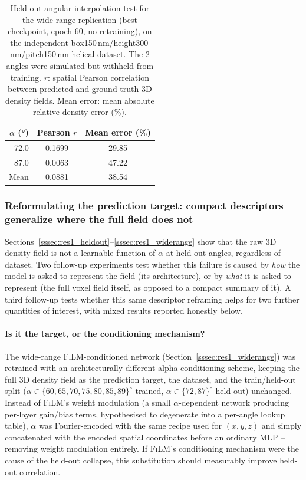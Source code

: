 \documentclass[aip,amsmath,amssymb,reprint]{revtex4-1}
\renewcommand{\ang}{\ensuremath{\alpha}} %
\newcommand{\film}{\textsc{FiLM}}
\begin{document}
\begin{table}[htbp]
  \centering
  \caption{%
    Held-out angular-interpolation test for the wide-range replication
    (best checkpoint, epoch 60, no retraining), on the independent
    box150\,nm/height300\,nm/pitch150\,nm helical dataset. The 2 angles
    were simulated but withheld from training. $r$: spatial Pearson
    correlation between predicted and ground-truth 3D density fields.
    Mean error: mean absolute relative density error (\%).
  }
  \label{tab:widerange_heldout}
  \begin{tabular}{rcc}
    \toprule
    $\ang$ (°) & Pearson $r$ & Mean error (\%) \\
    \midrule
    72.0 & 0.1699 & 29.85 \\
    87.0 & 0.0063 & 47.22 \\
    \midrule
    Mean & 0.0881 & 38.54 \\
    \bottomrule
  \end{tabular}
\end{table}

\subsubsection{Reformulating the prediction target: compact descriptors generalize where the full field does not}
\label{sssec:res1_descriptors}

Sections~\ref{sssec:res1_heldout}--\ref{sssec:res1_widerange} show that
the raw 3D density field is not a learnable function of $\ang$ at
held-out angles, regardless of dataset. Two follow-up experiments test
whether this failure is caused by \emph{how} the model is asked to
represent the field (its architecture), or by \emph{what} it is asked
to represent (the full voxel field itself, as opposed to a compact
summary of it). A third follow-up tests whether this same descriptor
reframing helps for two further quantities of interest, with mixed
results reported honestly below.

\paragraph{Is it the target, or the conditioning mechanism?}
The wide-range \film{}-conditioned network (Section~\ref{sssec:res1_widerange})
was retrained with an architecturally different alpha-conditioning
scheme, keeping the full 3D density field as the prediction target,
the dataset, and the train/held-out split ($\ang\in\{60,65,70,75,80,85,89\}^{\circ}$
trained, $\ang\in\{72,87\}^{\circ}$ held out) unchanged. Instead of
\film{}'s weight modulation (a small $\alpha$-dependent network
producing per-layer gain/bias terms, hypothesised to degenerate into a
per-angle lookup table), $\alpha$ was Fourier-encoded with the same
recipe used for $(x,y,z)$ and simply concatenated with the encoded
spatial coordinates before an ordinary MLP -- removing weight
modulation entirely. If \film{}'s conditioning mechanism were the
cause of the held-out collapse, this substitution should measurably
improve held-out correlation.
\end{document}
